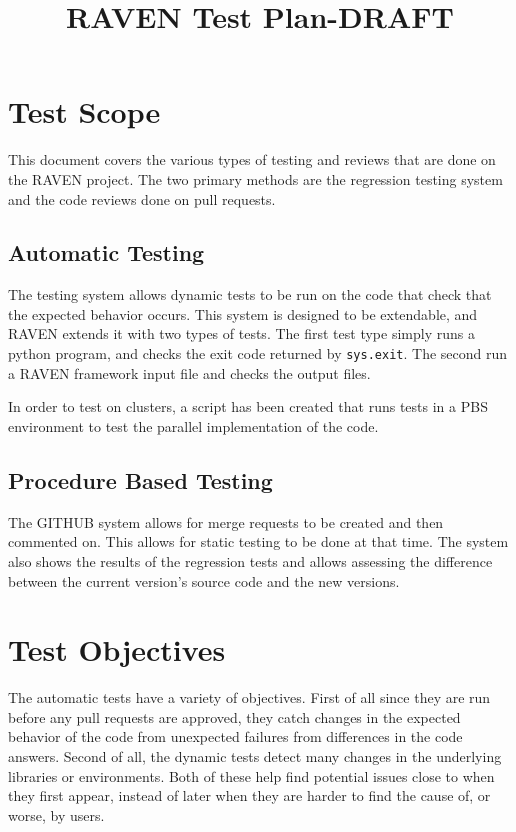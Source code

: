 \documentclass{article}
\title{RAVEN Test Plan-DRAFT}
\begin{document}
\maketitle

\section{Test Scope}

This document covers the various types of testing and reviews that are
done on the RAVEN project. The two primary methods are the 
regression testing system and the code reviews done on pull requests.

\subsection{Automatic Testing}

The  testing system allows dynamic tests to be run on the code
that check that the expected behavior occurs.  This system is designed
to be extendable, and RAVEN extends it with two types of tests.  The
first test type simply runs a python program, and checks the exit code
returned by \verb'sys.exit'.  The second run a RAVEN framework input
file and checks the output files.

In order to test on clusters, a script has been created that runs
tests in a PBS environment to test the parallel implementation of the
code.

\subsection{Procedure Based Testing}

The GITHUB system allows for merge requests to be created and then
commented on.  This allows for static testing to be done at that time.
The system also shows the results of the regression tests and allows
assessing the difference between the current version's source code and
the new versions.

\section{Test Objectives}

The automatic tests have a variety of objectives.  First of all since
they are run before any pull requests are approved, they catch
changes in the expected behavior of the code from unexpected failures
from differences in the code answers.  Second of all, the dynamic
tests detect many changes in the underlying libraries or environments.
Both of these help find potential issues close to when they first
appear, instead of later when they are harder to find the cause of, or
worse, by users.
\end{document}
